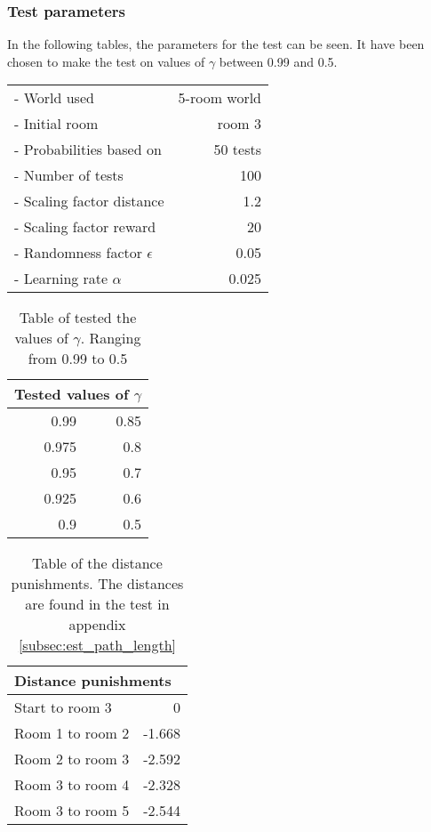 \documentclass[../Head/Main.tex]{subfiles}
\begin{document}
\subsubsection{Test parameters}
In the following tables, the parameters for the test can be seen. It have been chosen to make the test on values of $\gamma$ between 0.99 and 0.5.\\
\begin{minipage}[c]{0.35\textwidth}
	\begin{tabular}{l r}
	- World used                   & 5-room world\\
	- Initial room                 & room 3\\	
	- Probabilities based on       & 50 tests\\	
	- Number of tests              & 100\\
	- Scaling factor distance      & 1.2\\
	- Scaling factor reward        & 20\\
	- Randomness factor $\epsilon$ & 0.05\\
	- Learning rate $\alpha$       & 0.025\\
	\end{tabular}
\end{minipage}	
\hfill
\begin{minipage}[c]{0.2\textwidth}
	\begin{table}[H]
		\centering
		\begin{tabular}{r r}
		\hline
		\multicolumn{2}{l}{\textbf{Tested values of $\gamma$}}\\ 			\hline
		0.99   & 0.85\\
		0.975  & 0.8\\
		0.95   & 0.7\\
		0.925  & 0.6\\
		0.9    & 0.5\\
		\hline
		\end{tabular}
		\caption{Table of tested the values of $\gamma$. Ranging from 0.99 to 0.5}
		\label{tab:test_gamma}
	\end{table}
\end{minipage}
\hfill
\begin{minipage}[c]{0.3\textwidth}
	\begin{table}[H]
	\centering
	\begin{tabular}{l r}
		\hline
		\multicolumn{2}{l}{\textbf{Distance punishments}}\\ 			\hline
		Start to room 3   & 0\\
		Room 1 to room 2  & -1.668\\
		Room 2 to room 3  & -2.592\\
		Room 3 to room 4  & -2.328\\
		Room 3 to room 5  & -2.544\\
		\hline
	\end{tabular}
	\caption{Table of the distance punishments. The distances are found in the test in appendix \ref{subsec:est_path_length}}
	\label{tab:distance_punishment_5_rooms_2}
\end{table}
\end{minipage}
\end{document}
